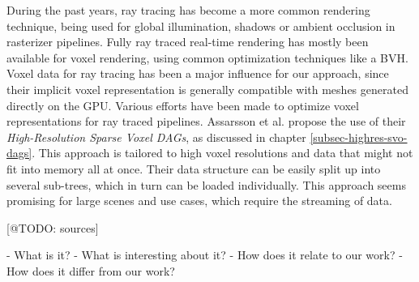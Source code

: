 \noindent
During the past years, ray tracing has become a more common rendering technique, being used for global illumination, 
shadows or ambient occlusion in rasterizer pipelines. Fully ray traced real-time rendering has mostly been available 
for voxel rendering, using common optimization techniques like a \ac{BVH}. Voxel data for ray tracing has been a 
major influence for our approach, since their implicit voxel representation is generally compatible with meshes 
generated directly on the \ac{GPU}. Various efforts have been made to optimize voxel representations for ray traced 
pipelines. Assarsson et al. \cite{Kampe2013} propose the use of their \emph{High-Resolution Sparse Voxel \ac{DAG}s}, 
as discussed in chapter \ref{subsec-highres-svo-dags}. This approach is tailored to high voxel resolutions and data that 
might not fit into memory all at once. Their data structure can be easily split up into several sub-trees, which in turn 
can be loaded individually. This approach seems promising for large scenes and use cases, which require the streaming of 
data. 


[@TODO: sources]















- What is it?
- What is interesting about it?
- How does it relate to our work?
- How does it differ from our work?
